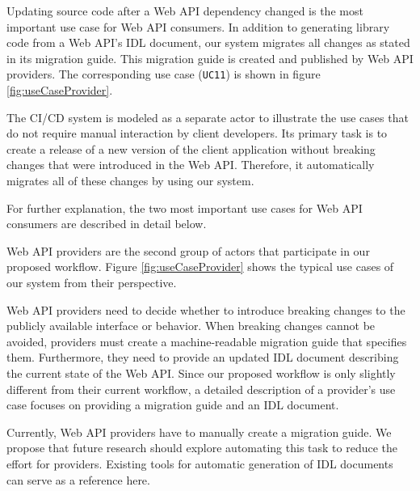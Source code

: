 Updating source code after a Web API dependency changed is the most important use case for Web API consumers. In addition to generating library code from a Web API's IDL document, our system migrates all changes as stated in its migration guide. This migration guide is created and published by Web API providers. The corresponding use case (\texttt{UC11}) is shown in figure \ref{fig:useCaseProvider}. 

The CI/CD system is modeled as a separate actor to illustrate the use cases that do not require manual interaction by client developers. Its primary task is to create a release of a new version of the client application without breaking changes that were introduced in the Web API. Therefore, it automatically migrates all of these changes by using our system.

For further explanation, the two most important use cases for Web API consumers are described in detail below.
\newpage

\newpage


Web API providers are the second group of actors that participate in our proposed workflow. Figure \ref{fig:useCaseProvider} shows the typical use cases of our system from their perspective.

\begin{figure}[h]
\end{figure}

Web API providers need to decide whether to introduce breaking changes to the publicly available interface or behavior. When breaking changes cannot be avoided, providers must create a machine-readable migration guide that specifies them. Furthermore, they need to provide an updated IDL document describing the current state of the Web API. Since our proposed workflow is only slightly different from their current workflow, a detailed description of a provider's use case focuses on providing a migration guide and an IDL document.



Currently, Web API providers have to manually create a migration guide. We propose that future research should explore automating this task to reduce the effort for providers. Existing tools for automatic generation of IDL documents can serve as a reference here.